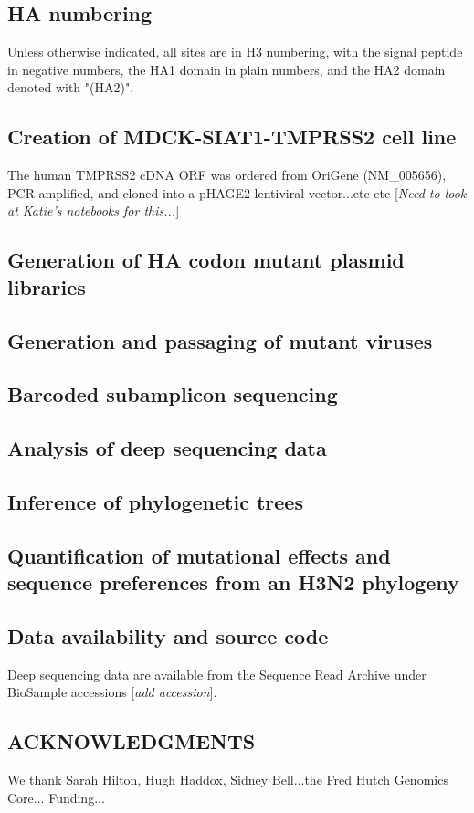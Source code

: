 \documentclass[11pt]{article}
\newcommand{\comment}[1]{{\color{red}[\textsl{#1}]}}
\begin{document}
\subsection*{HA numbering}
Unless otherwise indicated, all sites are in H3 numbering, with the signal peptide in negative numbers, the HA1 domain in plain numbers, and the HA2 domain denoted with "(HA2)".

\subsection*{Creation of MDCK-SIAT1-TMPRSS2 cell line}
The human TMPRSS2 cDNA ORF was ordered from OriGene (NM\_005656), PCR amplified, and cloned into a pHAGE2 lentiviral vector...etc etc
\comment{Need to look at Katie's notebooks for this...}

\subsection*{Generation of HA codon mutant plasmid libraries}

\subsection*{Generation and passaging of mutant viruses}

\subsection*{Barcoded subamplicon sequencing}

\subsection*{Analysis of deep sequencing data}

\subsection*{Inference of phylogenetic trees}

\subsection*{Quantification of mutational effects and sequence preferences from an H3N2 phylogeny}

\subsection*{Data availability and source code}
Deep sequencing data are available from the Sequence Read Archive under BioSample accessions \comment{add accession}.


\subsection*{ACKNOWLEDGMENTS}
We thank Sarah Hilton, Hugh Haddox, Sidney Bell...the Fred Hutch Genomics Core...
Funding...





\clearpage
\normalsize
\end{document}
